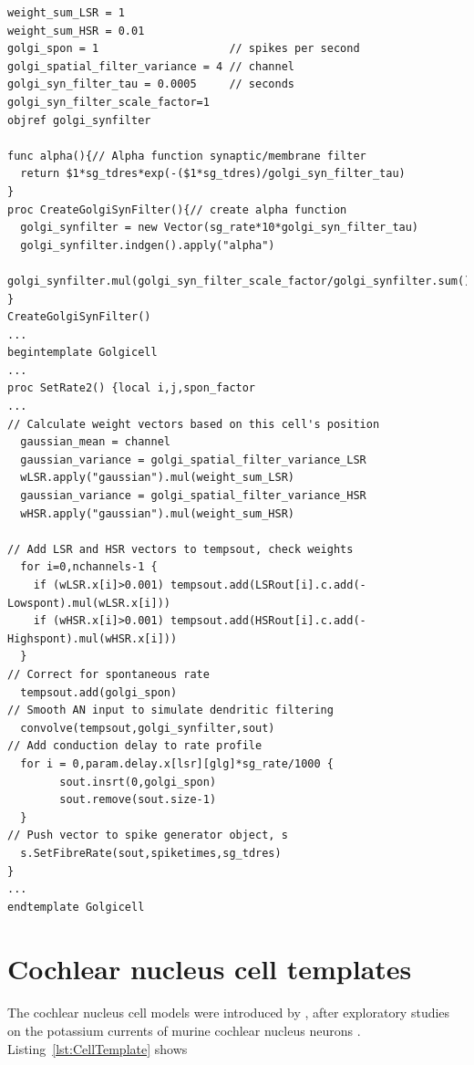  \begin{lstlisting}[label=GolgiTemplate,caption=Create golgi cell rate vector
   within Golgi template (in CNcell.tem)]
weight_sum_LSR = 1
weight_sum_HSR = 0.01
golgi_spon = 1                    // spikes per second
golgi_spatial_filter_variance = 4 // channel 
golgi_syn_filter_tau = 0.0005     // seconds 
golgi_syn_filter_scale_factor=1
objref golgi_synfilter

func alpha(){// Alpha function synaptic/membrane filter 
  return $1*sg_tdres*exp(-($1*sg_tdres)/golgi_syn_filter_tau)
}
proc CreateGolgiSynFilter(){// create alpha function 
  golgi_synfilter = new Vector(sg_rate*10*golgi_syn_filter_tau)
  golgi_synfilter.indgen().apply("alpha")  
  golgi_synfilter.mul(golgi_syn_filter_scale_factor/golgi_synfilter.sum()) 
}
CreateGolgiSynFilter()
...
begintemplate Golgicell
...
proc SetRate2() {local i,j,spon_factor
...
// Calculate weight vectors based on this cell's position 
  gaussian_mean = channel
  gaussian_variance = golgi_spatial_filter_variance_LSR
  wLSR.apply("gaussian").mul(weight_sum_LSR)
  gaussian_variance = golgi_spatial_filter_variance_HSR
  wHSR.apply("gaussian").mul(weight_sum_HSR)

// Add LSR and HSR vectors to tempsout, check weights 
  for i=0,nchannels-1 {
    if (wLSR.x[i]>0.001) tempsout.add(LSRout[i].c.add(-Lowspont).mul(wLSR.x[i]))
    if (wHSR.x[i]>0.001) tempsout.add(HSRout[i].c.add(-Highspont).mul(wHSR.x[i]))
  }
// Correct for spontaneous rate 
  tempsout.add(golgi_spon)
// Smooth AN input to simulate dendritic filtering 
  convolve(tempsout,golgi_synfilter,sout)
// Add conduction delay to rate profile 
  for i = 0,param.delay.x[lsr][glg]*sg_rate/1000 {
        sout.insrt(0,golgi_spon)
        sout.remove(sout.size-1)
  }
// Push vector to spike generator object, s 
  s.SetFibreRate(sout,spiketimes,sg_tdres)
}
...
endtemplate Golgicell
\end{lstlisting}


\section{Cochlear nucleus cell templates}

The cochlear nucleus cell models were introduced by \citet{RothmanManis:2003b},
after exploratory studies on the potassium currents of murine cochlear nucleus
neurons
\citep{RothmanManis:2003,RothmanManis:2003a}. Listing~\ref{lst:CellTemplate}
shows

